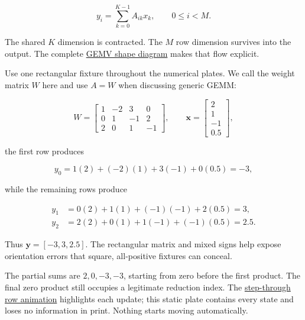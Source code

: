 \begin{equation}
y_i=\sum_{k=0}^{K-1}A_{ik}x_k,
\qquad 0\le i<M.
\end{equation}

The shared \(K\) dimension is contracted. The \(M\) row dimension
survives into the output. The complete
\href{https://github.com/hermonai/inside-the-llm-engine/blob/astra-visual-rewrite/diagrams/linear/gemv-shape-contract.txt}{GEMV
shape diagram} makes that flow explicit.

Use one rectangular fixture throughout the numerical plates. We call the
weight matrix \(W\) here and use \(A=W\) when discussing generic GEMM:

\begin{equation}
W=
\begin{bmatrix}
1&-2&3&0\\
0&1&-1&2\\
2&0&1&-1
\end{bmatrix},
\qquad
\mathbf{x}=
\begin{bmatrix}
2\\1\\-1\\0.5
\end{bmatrix},
\end{equation}

the first row produces

\begin{equation}
y_0=1(2)+(-2)(1)+3(-1)+0(0.5)=-3,
\end{equation}

while the remaining rows produce

\begin{equation}
\begin{aligned}
y_1&=0(2)+1(1)+(-1)(-1)+2(0.5)=3,\\
y_2&=2(2)+0(1)+1(-1)+(-1)(0.5)=2.5.
\end{aligned}
\end{equation}

Thus \(\mathbf{y}=[-3,3,2.5]\). The rectangular matrix and mixed signs
help expose orientation errors that square, all-positive fixtures can
conceal.


The partial sums are \(2,0,-3,-3\), starting from zero before the first
product. The final zero product still occupies a legitimate reduction
index. The
\href{https://github.com/hermonai/inside-the-llm-engine/blob/astra-visual-rewrite/figures/generated/ch06-row.html}{step-through
row animation} highlights each update; this static plate contains every
state and loses no information in print. Nothing starts moving
automatically.

